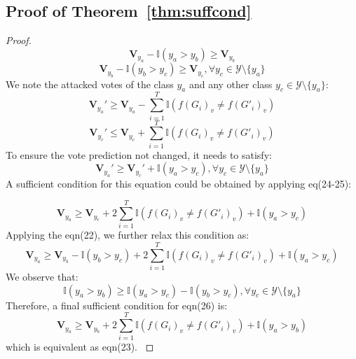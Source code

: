 \subsection{Proof of Theorem~\ref{thm:suffcond}}

\begin{proof}
\begin{equation}
    \mathbf{V}_{y_{a}}-\mathbb{I}(y_{a}>y_{b})\geq \mathbf{V}_{y_{b}}
\end{equation}
\begin{equation}
    \mathbf{V}_{y_{b}}-\mathbb{I}(y_{b}>y_{c})\geq \mathbf{V}_{y_{c}}, \forall y_c \in \mathcal{Y}\setminus\{y_{a}\}
\end{equation}
We note the attacked votes of the class $y_a$ and any other class $y_{c}\in \mathcal{Y}\setminus \{y_{a}\}$:
\begin{equation}
\mathbf{V}_{y_{a}}'\geq \mathbf{V}_{y_{a}} - \sum_{i=1}^{T}\mathbb{I}(f(G_{i})_v\neq f(G'_{i})_v) 
\end{equation}
\begin{equation}
\mathbf{V}_{y_{c}}'\leq \mathbf{V}_{y_{c}} + \sum_{i=1}^{T}\mathbb{I}(f(G_{i})_v\neq f(G'_{i})_v)
\end{equation}
To ensure the vote prediction not changed, it needs to satisfy:
\begin{equation}
\mathbf{V}_{y_{a}}'\geq \mathbf{V}_{y_c}'+\mathbb{I}(y_{a}>y_{c}),\forall y_{c}\in \mathcal{Y}\setminus \{y_{a}\}
\end{equation}
A sufficient condition for this equation could be obtained by applying eq(24-25):

\begin{equation}
\mathbf{V}_{y_{a}}\geq \mathbf{V}_{y_{c}} + 2\sum_{i=1}^{T}\mathbb{I}(f(G_{i})_v\neq f(G'_{i})_v)+\mathbb{I}(y_{a}>y_{c})
\end{equation}
Applying the eqn(22), we further relax this condition as:
\begin{equation}
\mathbf{V}_{y_{a}} \geq \mathbf{V}_{y_{b}}-\mathbb{I}(y_{b}>y_{c})+ 2\sum_{i=1}^{T}\mathbb{I}(f(G_{i})_v\neq f(G'_{i})_v)+\mathbb{I}(y_{a}>y_{c})
\end{equation}
We observe that:
\begin{equation}
\mathbb{I}(y_{a}>y_{b})\geq \mathbb{I}(y_{a}>y_{c})-\mathbb{I}(y_{b}>y_{c})
,\forall y_{c}\in \mathcal{Y}\setminus \{y_{a}\}\end{equation}
Therefore, a final sufficient condition for eqn(26) is:
\begin{equation}
\mathbf{V}_{y_{a}} \geq \mathbf{V}_{y_{b}}+2\sum_{i=1}^{T}\mathbb{I}(f(G_{i})_v\neq f(G'_{i})_v)+\mathbb{I}(y_{a}>y_{b})
\end{equation}
which is equivalent as eqn(23).
\label{Sec:VotingClass}
\end{proof}


